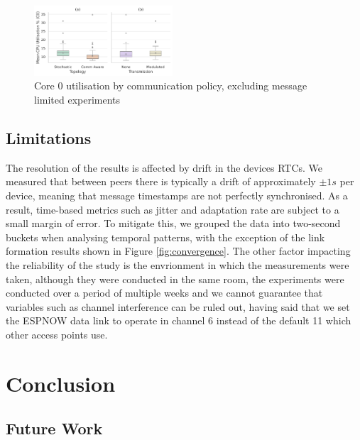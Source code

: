 \documentclass[conference]{IEEEtran}
\begin{document}
\begin{figure}[H]
    \centering
    \includegraphics[width=0.46\textwidth]{cpu_util.pdf}
    \caption{Core 0 utilisation by communication policy, excluding message limited experiments}
    \label{fig:cpu_util}
\end{figure}


\subsection{Limitations}

The resolution of the results is affected by drift in the devices RTCs. We measured that between peers there is typically a drift of approximately $\pm1s$ per device, meaning that message timestamps are not perfectly synchronised. As a result, time-based metrics such as jitter and adaptation rate are subject to a small margin of error. To mitigate this, we grouped the data into two-second buckets when analysing temporal patterns, with the exception of the link formation results shown in Figure \ref{fig:convergence}. The other factor impacting the reliability of the study is the envrionment in which the measurements were taken, although they were conducted in the same room, the experiments were conducted over a period of multiple weeks and we cannot guarantee that variables such as channel interference can be ruled out, having said that we set the ESPNOW data link to operate in channel 6 instead of the default 11 which other access points use.

\section{Conclusion}

\subsection{Future Work}


\newpage
\printbibliography
\end{document}

